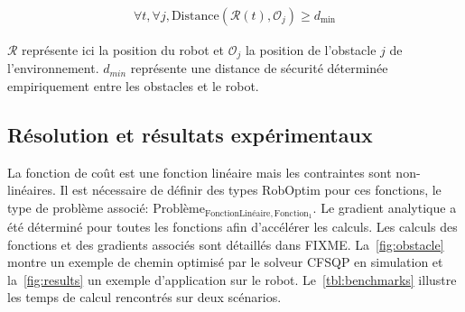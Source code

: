 \begin{eqnarray}
\forall t, \forall j, \text{Distance}(\mathcal{R}(t), \mathcal{O}_j) \geq d_{\min}
\end{eqnarray}

$\mathcal{R}$ représente ici la position du robot et $\mathcal{O}_j$
la position de l'obstacle $j$ de l'environnement. $d_{min}$ représente
une distance de sécurité déterminée empiriquement entre les obstacles
et le robot.


\subsection{Résolution et résultats expérimentaux}


La fonction de coût est une fonction linéaire mais les contraintes
sont non-linéaires. Il est nécessaire de définir des types RobOptim
pour ces fonctions, le type de problème associé:
$\text{Problème}_{\text{FonctionLinéaire}, \text{Fonction}_1}$. Le
gradient analytique a été déterminé pour toutes les fonctions afin
d'accélérer les calculs. Les calculs des fonctions et des gradients
associés sont détaillés dans FIXME. La~\autoref{fig:obstacle} montre
un exemple de chemin optimisé par le solveur CFSQP en simulation et
la~\autoref{fig:results} un exemple d'application sur le
robot. Le~\autoref{tbl:benchmarks} illustre les temps de calcul
rencontrés sur deux scénarios.

